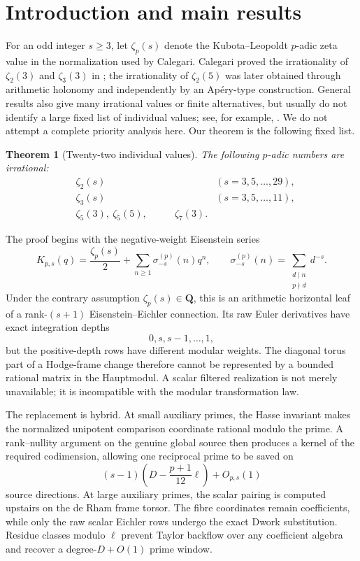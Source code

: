 \documentclass[11pt]{article}
\newtheorem{theorem}{Theorem}[section]
\theoremstyle{definition}
\theoremstyle{remark}
\newcommand{\Q}{\mathbf Q}
\begin{document}
\tableofcontents

\section{Introduction and main results}\label{sec:intro}

For an odd integer $s\ge3$, let $\zeta_p(s)$ denote the Kubota--Leopoldt
$p$-adic zeta value in the normalization used by Calegari.  Calegari proved the
irrationality of $\zeta_2(3)$ and $\zeta_3(3)$ in \cite{Calegari2005}; the
irrationality of $\zeta_2(5)$ was later obtained through arithmetic holonomy
and independently by an Ap\'ery-type construction.  General results also give
many irrational values or finite alternatives, but usually do not identify a
large fixed list of individual values; see, for example,
\cite{Lai2025,LaiLupuSprang2025,LaiSprang2025}.  We do not attempt a complete
priority analysis here.  Our theorem is the following fixed list.

\begin{theorem}[Twenty-two individual values]\label{thm:main}
The following $p$-adic numbers are irrational:
\[
\begin{aligned}
 &\zeta_2(s) &&(s=3,5,\ldots,29),\\
 &\zeta_3(s) &&(s=3,5,\ldots,11),\\
 &\zeta_5(3),\ \zeta_5(5),\qquad
 &\zeta_7(3).&
\end{aligned}
\]
\end{theorem}

The proof begins with the negative-weight Eisenstein series
\[
 K_{p,s}(q)=\frac{\zeta_p(s)}2+
 \sum_{n\ge1}\sigma_{-s}^{(p)}(n)q^n,
 \qquad
 \sigma_{-s}^{(p)}(n)=
 \sum_{\substack{d\mid n\\p\nmid d}}d^{-s}.
\]
Under the contrary assumption $\zeta_p(s)\in\Q$, this is an arithmetic
horizontal leaf of a rank-$(s+1)$ Eisenstein--Eichler connection.  Its raw
Euler derivatives have exact integration depths
\[
 0,s,s-1,\ldots,1,
\]
but the positive-depth rows have different modular weights.  The diagonal
torus part of a Hodge-frame change therefore cannot be represented by a
bounded rational matrix in the Hauptmodul.  A scalar filtered realization is
not merely unavailable; it is incompatible with the modular transformation
law.

The replacement is hybrid.  At small auxiliary primes, the Hasse invariant
makes the normalized unipotent comparison coordinate rational modulo the
prime.  A rank--nullity argument on the genuine global source then produces a
kernel of the required codimension, allowing one reciprocal prime to be saved
on
\[
 (s-1)\left(D-\frac{p+1}{12}\ell\right)+O_{p,s}(1)
\]
source directions.  At large auxiliary primes, the scalar pairing is computed
upstairs on the de Rham frame torsor.  The fibre coordinates remain
coefficients, while only the raw scalar Eichler rows undergo the exact Dwork
substitution.  Residue classes modulo $\ell$ prevent Taylor backflow over any
coefficient algebra and recover a degree-$D+O(1)$ prime window.
\end{document}
